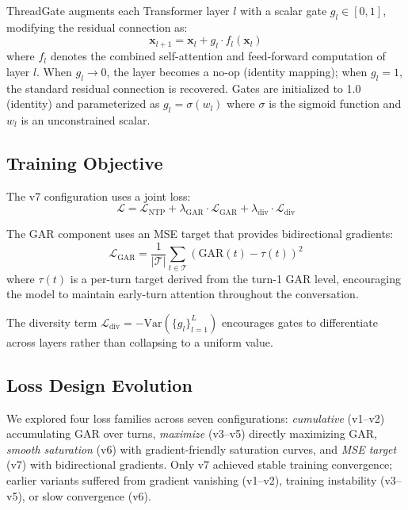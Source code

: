 \documentclass[11pt]{article}
\begin{document}
ThreadGate augments each Transformer layer $l$ with a scalar gate $g_l \in [0,1]$, modifying the residual connection as:
\begin{equation}
\mathbf{x}_{l+1} = \mathbf{x}_l + g_l \cdot f_l(\mathbf{x}_l)
\label{eq:gate}
\end{equation}
where $f_l$ denotes the combined self-attention and feed-forward computation of layer $l$.
When $g_l \to 0$, the layer becomes a no-op (identity mapping); when $g_l = 1$, the standard residual connection is recovered.
Gates are initialized to 1.0 (identity) and parameterized as $g_l = \sigma(w_l)$ where $\sigma$ is the sigmoid function and $w_l$ is an unconstrained scalar.

\subsection{Training Objective}

The v7 configuration uses a joint loss:
\begin{equation}
\mathcal{L} = \mathcal{L}_{\text{NTP}} + \lambda_{\text{GAR}} \cdot \mathcal{L}_{\text{GAR}} + \lambda_{\text{div}} \cdot \mathcal{L}_{\text{div}}
\end{equation}

The GAR component uses an MSE target that provides bidirectional gradients:
\begin{equation}
\mathcal{L}_{\text{GAR}} = \frac{1}{|\mathcal{T}|} \sum_{t \in \mathcal{T}} \left( \text{GAR}(t) - \tau(t) \right)^2
\end{equation}
where $\tau(t)$ is a per-turn target derived from the turn-1 GAR level, encouraging the model to maintain early-turn attention throughout the conversation.

The diversity term $\mathcal{L}_{\text{div}} = -\text{Var}(\{g_l\}_{l=1}^{L})$ encourages gates to differentiate across layers rather than collapsing to a uniform value.

\subsection{Loss Design Evolution}

We explored four loss families across seven configurations:
\emph{cumulative} (v1--v2) accumulating GAR over turns,
\emph{maximize} (v3--v5) directly maximizing GAR,
\emph{smooth saturation} (v6) with gradient-friendly saturation curves, and
\emph{MSE target} (v7) with bidirectional gradients.
Only v7 achieved stable training convergence; earlier variants suffered from gradient vanishing (v1--v2), training instability (v3--v5), or slow convergence (v6).
\end{document}
